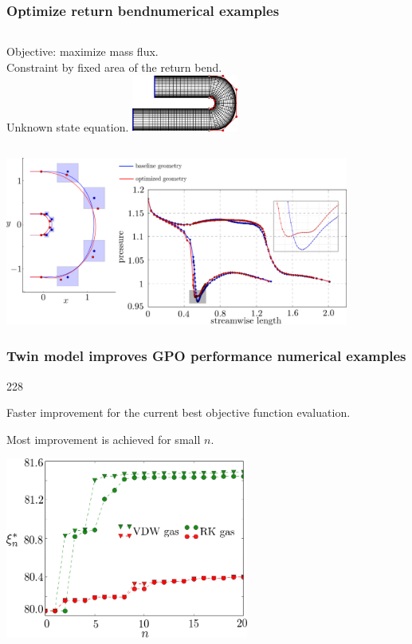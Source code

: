 \documentclass{beamer}
\newcommand{\barrow}{\item[\color{darkred}\ding{228}]}
\begin{document}
\begin{frame}
    \frametitle{Optimize return bend\hfill \scriptsize{numerical examples}}\small
    \begin{columns}
        Objective: maximize mass flux.\\
        Constraint by fixed area of the return bend.\\
        Unknown state equation.
        \includegraphics[width=3.5cm]{spline_simple.png}
    \end{columns}
    \vspace{.3cm}
    \begin{center}
    \includegraphics[width=11.3cm]{Ubend_combined_new.png}
    \end{center}
\end{frame}

\begin{frame}
    \frametitle{Twin model improves GPO performance \hfill \scriptsize{numerical examples}}\small
    \begin{dinglist}{228}
        \barrow Faster improvement for the current best objective function evaluation.
        \barrow Most improvement is achieved for small $n$.
    \end{dinglist}
    \begin{center}
        \includegraphics[width=8cm]{obj_ubend_2_new.png}
    \end{center}
\end{frame}
\end{document}

